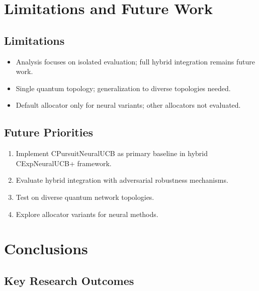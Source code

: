 \documentclass[12pt,a4paper]{article}
\begin{document}
\section{Limitations and Future Work}

\subsection{Limitations}
\begin{itemize}
\item Analysis focuses on isolated evaluation; full hybrid integration remains future work.
\item Single quantum topology; generalization to diverse topologies needed.
\item Default allocator only for neural variants; other allocators not evaluated.
\end{itemize}

\subsection{Future Priorities}
\begin{enumerate}
\item Implement CPursuitNeuralUCB as primary baseline in hybrid CExpNeuralUCB+ framework.
\item Evaluate hybrid integration with adversarial robustness mechanisms.
\item Test on diverse quantum network topologies.
\item Explore allocator variants for neural methods.
\end{enumerate}

\section{Conclusions}

\subsection{Key Research Outcomes}
\end{document}
